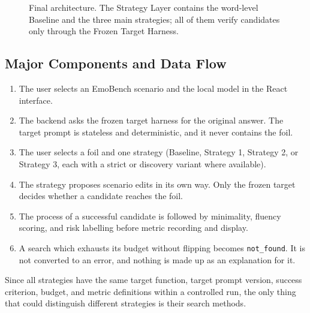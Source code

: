 \documentclass[11pt,a4paper]{article}
\begin{document}
\begin{figure}[htbp]
{%
}
\caption{Final architecture. The Strategy Layer contains the word-level Baseline and
the three main strategies; all of them verify candidates only through the Frozen
Target Harness.}
\label{fig:architecture}
\end{figure}

\subsection{Major Components and Data Flow}

\begin{enumerate}
  \item The user selects an EmoBench scenario and the local model in the React
  interface.
  \item The backend asks the frozen target harness for the original answer. The target
  prompt is stateless and deterministic, and it never contains the foil.
  \item The user selects a foil and one strategy (Baseline, Strategy 1, Strategy 2, or
  Strategy 3, each with a strict or discovery variant where available).
  \item The strategy proposes scenario edits in its own way. Only the frozen target
  decides whether a candidate reaches the foil.
  \item The process of a successful candidate is followed by minimality, fluency
  scoring, and risk labelling before metric recording and display.
  \item A search which exhausts its budget without flipping becomes
  \texttt{not\_found}. It is not converted to an error, and nothing is made up as an
  explanation for it.
\end{enumerate}

Since all strategies have the same target function, target prompt version, success
criterion, budget, and metric definitions within a controlled run, the only thing that
could distinguish different strategies is their search methods.
\end{document}

